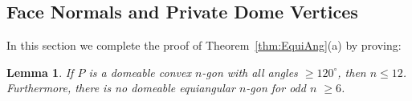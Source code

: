\documentclass[11pt]{article}
\newtheorem{lemma}[theorem]{Lemma}
\newcommand{\figlab}[1]{\label{fig:#1}}
\newcommand{\seclab}[1]{\label{sec:#1}}
\newcommand{\thmref}[1]{\ref{thm:#1}}
\newcommand{\figref}[1]{\ref{fig:#1}}
\def\b{{\beta}}
\newcommand{\JOR}[1]{{\color{red} JOR: [#1]}}
\newcommand{\Anna}[1]{{\color{red} Anna: [#1]}}
\begin{document}
%


\subsection{Face Normals and Private Dome Vertices}
\seclab{NormalsPrivate}


In this section we complete the proof of Theorem~\thmref{EquiAng}(a) by proving:

\begin{lemma}
\label{lem:12-and-6}
If $P$ is a domeable convex $n$-gon with all angles $\ge 120^\circ$, then $n \le 12$. 
Furthermore, there is no domeable equiangular $n$-gon for odd $n$ $ \ge 6$.   
\end{lemma}
\end{document}
